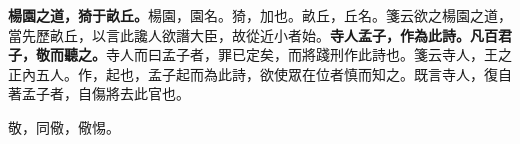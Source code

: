 \textbf{楊園之道，猗于畝丘。}{\footnotesize 楊園，園名。猗，加也。畝丘，丘名。箋云欲之楊園之道，當先歷畝丘，以言此讒人欲譖大臣，故從近小者始。}\textbf{寺人孟子，作為此詩。凡百君子，敬而聽之。}{\footnotesize 寺人而曰孟子者，罪已定矣，而將踐刑作此詩也。箋云寺人，王之正內五人。作，起也，孟子起而為此詩，欲使眾在位者慎而知之。既言寺人，復自著孟子者，自傷將去此官也。}

\begin{quoting}敬，同儆，儆惕。\end{quoting}

